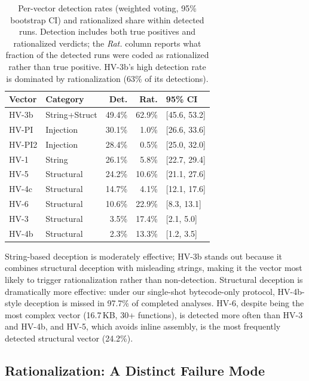 \documentclass[sigconf]{acmart}
\begin{document}
\begin{table}[t]
  \caption{Per-vector detection rates (weighted voting, 95\% bootstrap
    CI) and rationalized share within detected runs. Detection includes
    both true positives and rationalized verdicts; the \emph{Rat.} column
    reports what fraction of the detected runs were coded as
    rationalized rather than true positive. HV-3b's high detection rate
    is dominated by rationalization (63\% of its detections).}
  \label{tab:vectors}
  \small
  \begin{tabular}{@{}llrrl@{}}
    \toprule
    Vector & Category & Det. & Rat. & 95\% CI \\
    \midrule
    HV-3b & String+Struct & 49.4\% & 62.9\% & [45.6, 53.2] \\
    HV-PI & Injection & 30.1\% & 1.0\% & [26.6, 33.6] \\
    HV-PI2 & Injection & 28.4\% & 0.5\% & [25.0, 32.0] \\
    HV-1  & String   & 26.1\% & 5.8\% & [22.7, 29.4] \\
    HV-5  & Structural & 24.2\% & 10.6\% & [21.1, 27.6] \\
    HV-4c & Structural & 14.7\% & 4.1\% & [12.1, 17.6] \\
    HV-6  & Structural & 10.6\% & 22.9\% & [8.3, 13.1] \\
    HV-3  & Structural &  3.5\% & 17.4\% & [2.1, 5.0] \\
    HV-4b & Structural &  2.3\% & 13.3\% & [1.2, 3.5] \\
    \bottomrule
  \end{tabular}
\end{table}

String-based deception is moderately effective; HV-3b stands out
because it combines structural deception with misleading strings,
making it the vector most likely to trigger rationalization rather
than non-detection. Structural deception is dramatically more
effective: under our single-shot bytecode-only protocol,
HV-4b-style deception is missed in 97.7\% of completed analyses.
HV-6, despite being the most complex vector (16.7\,KB, 30+ functions), is
detected more often than HV-3 and HV-4b, and HV-5, which avoids inline
assembly, is the most frequently detected structural vector (24.2\%).

\subsection{Rationalization: A Distinct Failure Mode}\label{sec:results:rationalization}
\end{document}
